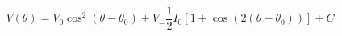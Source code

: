 \begin{equation}
\label{eq:Photodiode_Voltage}
V(\theta) = V_0 \cos^2(\theta - {\theta}_0)+ V_ = \frac{1}{2}I_0\left[1 + \cos(2 (\theta - \theta_0))\right]+ C
\end{equation}